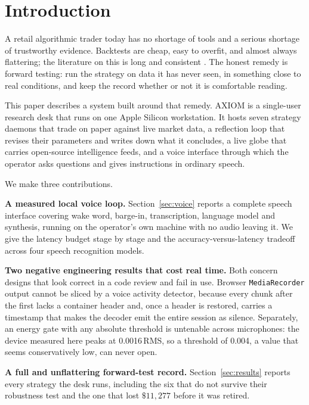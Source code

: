 \documentclass[conference]{IEEEtran}
\begin{document}
\section{Introduction}

A retail algorithmic trader today has no shortage of tools and a serious
shortage of trustworthy evidence. Backtests are cheap, easy to overfit, and
almost always flattering; the literature on this is long and consistent
\cite{bailey2014,harvey2016,white2000}. The honest remedy is forward testing:
run the strategy on data it has never seen, in something close to real
conditions, and keep the record whether or not it is comfortable reading.

This paper describes a system built around that remedy. AXIOM is a single-user
research desk that runs on one Apple Silicon workstation. It hosts seven
strategy daemons that trade on paper against live market data, a reflection
loop that revises their parameters and writes down what it concludes, a live
globe that carries open-source intelligence feeds, and a voice interface
through which the operator asks questions and gives instructions in ordinary
speech.

We make three contributions.

\textbf{A measured local voice loop.} Section~\ref{sec:voice} reports a
complete speech interface covering wake word, barge-in, transcription, language
model and synthesis, running on the operator's own machine with no audio leaving
it. We give the latency budget stage by stage and the accuracy-versus-latency
tradeoff across four speech recognition models.

\textbf{Two negative engineering results that cost real time.} Both concern
designs that look correct in a code review and fail in use. Browser
\texttt{MediaRecorder} output cannot be sliced by a voice activity detector,
because every chunk after the first lacks a container header and, once a header
is restored, carries a timestamp that makes the decoder emit the entire session
as silence. Separately, an energy gate with any absolute threshold is untenable
across microphones: the device measured here peaks at 0.0016\,RMS, so a
threshold of 0.004, a value that seems conservatively low, can never open.

\textbf{A full and unflattering forward-test record.} Section~\ref{sec:results}
reports every strategy the desk runs, including the six that do not survive
their robustness test and the one that lost $\$11{,}277$ before it was retired.
\end{document}
